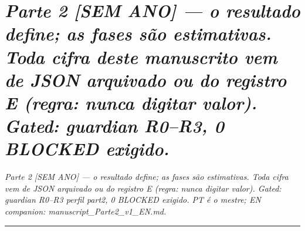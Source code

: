 \documentclass[12pt,a4paper,oneside]{report}
\begin{document}
\hypertarget{parte-2-sem-ano-o-resultado-define-as-fases-suxe3o-estimativas.-toda-cifra-deste-manuscrito-vem-de-json-arquivado-ou-do-registro-e-regra-nunca-digitar-valor.-gated-guardian-r0r3-0-blocked-exigido.}{%
\section{\texorpdfstring{\emph{Parte 2 {[}SEM ANO{]} --- o resultado
define; as fases são estimativas. Toda cifra deste manuscrito vem de
JSON arquivado ou do registro E (regra: nunca digitar valor). Gated:
guardian R0--R3, 0 BLOCKED
exigido.}}{Parte 2 {[}SEM ANO{]} --- o resultado define; as fases são estimativas. Toda cifra deste manuscrito vem de JSON arquivado ou do registro E (regra: nunca digitar valor). Gated: guardian R0--R3, 0 BLOCKED exigido.}}\label{parte-2-sem-ano-o-resultado-define-as-fases-suxe3o-estimativas.-toda-cifra-deste-manuscrito-vem-de-json-arquivado-ou-do-registro-e-regra-nunca-digitar-valor.-gated-guardian-r0r3-0-blocked-exigido.}}

\emph{Parte 2 {[}SEM ANO{]} --- o resultado define; as fases são
estimativas. Toda cifra vem de JSON arquivado ou do registro E (regra:
nunca digitar valor). Gated: guardian R0--R3 perfil part2, 0 BLOCKED
exigido. PT é o mestre; EN companion: manuscript\_Parte2\_v1\_EN.md.}

\begin{center}\rule{0.5\linewidth}{0.5pt}\end{center}
\end{document}
